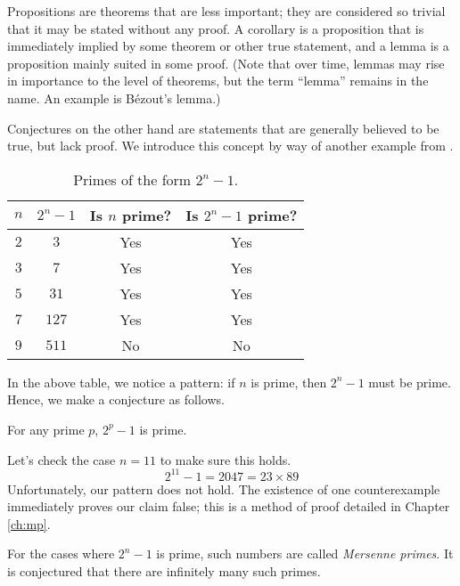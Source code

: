 Propositions are theorems that are less important; they are considered so trivial that it may be stated
without any proof. A corollary is a proposition that is immediately implied by some theorem or other true
statement, and a lemma is a proposition mainly suited in some proof. (Note that over time, lemmas may
rise in importance to the level of theorems, but the term ``lemma'' remains in the name. An example is
B\'{e}zout's lemma.)

Conjectures on the other hand are statements that are generally believed to be true, but lack proof. We introduce
this concept by way of another example from \cite{Velleman_2019}.

\begin{table}[h]
    \centering
    \begin{tabular}{|c|c|c|c|}
        \hline
        $n$ & $2^n - 1$ & Is $n$ prime? & Is $2^n - 1$ prime? \\ \hline
        $2$ & $3$       & Yes           & Yes                 \\ \hline
        $3$ & $7$       & Yes           & Yes                 \\ \hline
        $5$ & $31$      & Yes           & Yes                 \\ \hline
        $7$ & $127$     & Yes           & Yes                 \\ \hline
        $9$ & $511$     & No            & No                  \\ \hline
    \end{tabular}
    \caption{Primes of the form $2^n - 1$.}
    \label{tab:mersenne-test}
\end{table}

In the above table, we notice a pattern: if $n$ is prime, then $2^n - 1$ must be prime. Hence, we make a conjecture as
follows.

\begin{conjecture}
    For any prime $p$, $2^p - 1$ is prime.
\end{conjecture}

Let's check the
case $n = 11$ to make sure this holds.
\[
2^{11} - 1 = 2047 = 23 \times 89
\]
Unfortunately, our pattern does not hold. The existence of one counterexample immediately proves our claim false;
this is a method of proof detailed in Chapter \ref{ch:mp}.

For the cases where $2^n - 1$ is prime, such numbers are called
\textit{Mersenne primes}. It is conjectured that there are infinitely many such primes.

